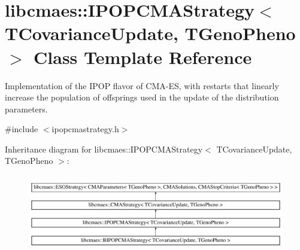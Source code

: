 \hypertarget{classlibcmaes_1_1IPOPCMAStrategy}{\section{libcmaes\-:\-:I\-P\-O\-P\-C\-M\-A\-Strategy$<$ T\-Covariance\-Update, T\-Geno\-Pheno $>$ Class Template Reference}
\label{classlibcmaes_1_1IPOPCMAStrategy}
}


Implementation of the I\-P\-O\-P flavor of C\-M\-A-\/\-E\-S, with restarts that linearly increase the population of offsprings used in the update of the distribution parameters.  




{\ttfamily \#include $<$ipopcmastrategy.\-h$>$}

Inheritance diagram for libcmaes\-:\-:I\-P\-O\-P\-C\-M\-A\-Strategy$<$ T\-Covariance\-Update, T\-Geno\-Pheno $>$\-:\begin{figure}[H]
\begin{center}
\leavevmode
\includegraphics[height=3.430321cm]{classlibcmaes_1_1IPOPCMAStrategy}
\end{center}
\end{figure}
